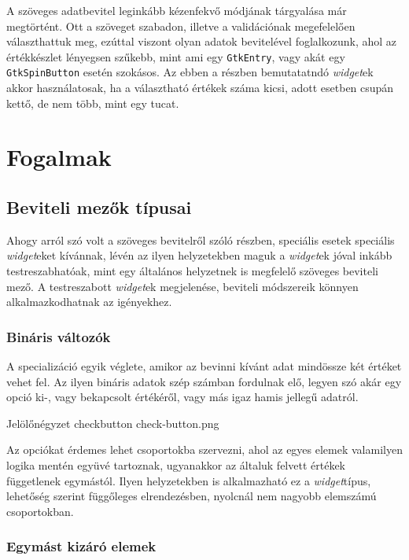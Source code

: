 A szöveges adatbevitel leginkább kézenfekvő módjának tárgyalása már megtörtént. Ott a szöveget szabadon, illetve a validációnak megefelelően választhattuk meg, ezúttal viszont olyan adatok bevitelével foglalkozunk, ahol az értékkészlet lényegsen szűkebb, mint ami egy \texttt{GtkEntry}, vagy akát egy \texttt{GtkSpinButton} esetén szokásos. Az ebben a részben bemutatatndó \textit{widget}ek akkor használatosak, ha a választható értékek száma kicsi, adott esetben csupán kettő, de nem több, mint egy tucat.

\section{Fogalmak}

\subsection{Beviteli mezők típusai}

Ahogy arról szó volt a szöveges bevitelről szóló részben, speciális esetek speciális \textit{widget}eket kívánnak, lévén az ilyen helyzetekben maguk a \textit{widget}ek jóval inkább testreszabhatóak, mint egy általános helyzetnek is megfelelő szöveges beviteli mező. A testreszabott \textit{widget}ek megjelenése, beviteli módszereik könnyen alkalmazkodhatnak az igényekhez.

\subsubsection{Bináris változók}

A specializáció egyik véglete, amikor az bevinni kívánt adat mindössze két értéket vehet fel. Az ilyen bináris adatok szép számban fordulnak elő, legyen szó akár egy opció ki-, vagy bekapcsolt értékéről, vagy más igaz hamis jellegű adatról.

{Jelölőnégyzet}
{checkbutton}
{check-button.png}

Az opciókat érdemes lehet csoportokba szervezni, ahol az egyes elemek valamilyen logika mentén együvé tartoznak, ugyanakkor az általuk felvett értékek függetlenek egymástól. Ilyen helyzetekben is alkalmazható ez a \textit{widget}típus, lehetőség szerint függőleges elrendezésben, nyolcnál nem nagyobb elemszámú csoportokban.

\subsubsection{Egymást kizáró elemek}

